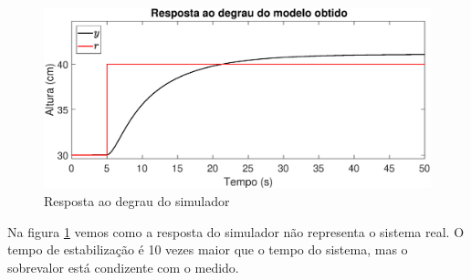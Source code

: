 \begin{figure}[htb]
	\centering
	\includegraphics[width=1\linewidth]{pasta1_figuras/step_simul}
	\caption[Resposta ao degrau do simulador]{Resposta ao degrau do simulador}
	\label{fig:stepsimul}
\end{figure}

Na figura \ref{fig:stepsimul} vemos como a resposta do simulador não representa o sistema real. O tempo de estabilização é 10 vezes maior que o tempo do sistema, mas o sobrevalor está condizente com o medido.



